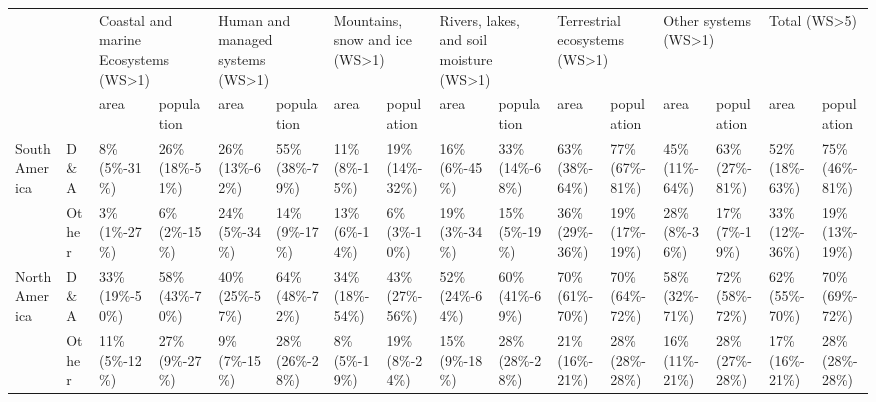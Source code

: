 \begin{tabular}{ll p{1cm} p{1cm} p{1cm} p{1cm} p{1cm} p{1cm} p{1cm} p{1cm} p{1cm} p{1cm} p{1cm} p{1cm} p{1cm} p{1cm}}
\toprule
       &       & \multicolumn{2}{L{2cm}}{Coastal and marine Ecosystems (WS>1)} & \multicolumn{2}{L{2cm}}{Human and managed systems (WS>1)} & \multicolumn{2}{L{2cm}}{Mountains, snow and ice (WS>1)} & \multicolumn{2}{L{2cm}}{Rivers, lakes, and soil moisture (WS>1)} & \multicolumn{2}{L{2cm}}{Terrestrial ecosystems (WS>1)} & \multicolumn{2}{L{2cm}}{Other systems (WS>1)} & \multicolumn{2}{L{2cm}}{Total (WS>5)} \\
       &       &                                 area &               population &                             area &               population &                           area &               population &                                    area &               population &                          area &               population &                     area &               population &                     area &               population \\
\midrule
South America & D\&A &                8\% \mbox{(5\%-31\%)} &  26\% \mbox{(18\%-51\%)} &          26\% \mbox{(13\%-62\%)} &  55\% \mbox{(38\%-79\%)} &         11\% \mbox{(8\%-15\%)} &  19\% \mbox{(14\%-32\%)} &                  16\% \mbox{(6\%-45\%)} &  33\% \mbox{(14\%-68\%)} &       63\% \mbox{(38\%-64\%)} &  77\% \mbox{(67\%-81\%)} &  45\% \mbox{(11\%-64\%)} &  63\% \mbox{(27\%-81\%)} &  52\% \mbox{(18\%-63\%)} &  75\% \mbox{(46\%-81\%)} \\
       & Other &                3\% \mbox{(1\%-27\%)} &    6\% \mbox{(2\%-15\%)} &           24\% \mbox{(5\%-34\%)} &   14\% \mbox{(9\%-17\%)} &         13\% \mbox{(6\%-14\%)} &    6\% \mbox{(3\%-10\%)} &                  19\% \mbox{(3\%-34\%)} &   15\% \mbox{(5\%-19\%)} &       36\% \mbox{(29\%-36\%)} &  19\% \mbox{(17\%-19\%)} &   28\% \mbox{(8\%-36\%)} &   17\% \mbox{(7\%-19\%)} &  33\% \mbox{(12\%-36\%)} &  19\% \mbox{(13\%-19\%)} \\
North America & D\&A &              33\% \mbox{(19\%-50\%)} &  58\% \mbox{(43\%-70\%)} &          40\% \mbox{(25\%-57\%)} &  64\% \mbox{(48\%-72\%)} &        34\% \mbox{(18\%-54\%)} &  43\% \mbox{(27\%-56\%)} &                 52\% \mbox{(24\%-64\%)} &  60\% \mbox{(41\%-69\%)} &       70\% \mbox{(61\%-70\%)} &  70\% \mbox{(64\%-72\%)} &  58\% \mbox{(32\%-71\%)} &  72\% \mbox{(58\%-72\%)} &  62\% \mbox{(55\%-70\%)} &  70\% \mbox{(69\%-72\%)} \\
       & Other &               11\% \mbox{(5\%-12\%)} &   27\% \mbox{(9\%-27\%)} &            9\% \mbox{(7\%-15\%)} &  28\% \mbox{(26\%-28\%)} &          8\% \mbox{(5\%-19\%)} &   19\% \mbox{(8\%-24\%)} &                  15\% \mbox{(9\%-18\%)} &  28\% \mbox{(28\%-28\%)} &       21\% \mbox{(16\%-21\%)} &  28\% \mbox{(28\%-28\%)} &  16\% \mbox{(11\%-21\%)} &  28\% \mbox{(27\%-28\%)} &  17\% \mbox{(16\%-21\%)} &  28\% \mbox{(28\%-28\%)} \\

\end{tabular}
